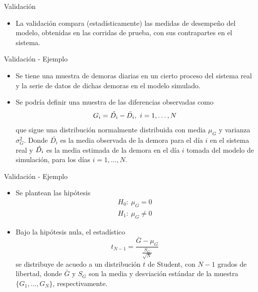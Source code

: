 \begin{frame}{Validación}
    \begin{itemize}
        \item La validación compara (estadísticamente) las medidas de desempeño del modelo, obtenidas en las corridas de prueba, con sus contrapartes en el sistema.
    \end{itemize}
\end{frame}

\begin{frame}{Validación - Ejemplo}
    \begin{itemize}
        \item Se tiene una muestra de demoras diarias en un cierto proceso del sistema real y la serie de datos de dichas demoras en el modelo simulado.
        \item Se podría definir una muestra de las diferencias observadas como \begin{equation*}
            G_i=\Hat{D_i}-\bar{D_i},~i=1,\dots, N
        \end{equation*}
        que sigue una distribución normalmente distribuida con media $\mu_G$ y varianza $\sigma^2_G$. Donde $\bar{D_i}$ es la media observada de la demora para el día $i$ en el sistema real y $\Hat{D_i}$ es la media estimada de la demora en el día $i$ tomada del modelo de simulación, para los días $i=1,\dots, N$.
    \end{itemize}
\end{frame}

\begin{frame}{Validación - Ejemplo}
    \begin{itemize}
        \item Se plantean las hipótesis 
        \begin{eqnarray*}
            H_0:~\mu_G=0\\
            H_1:~\mu_G \neq 0
        \end{eqnarray*}
        \item Bajo la hipótesis nula, el estadístico
        \begin{equation*}
            t_{N-1}=\frac{\bar{G}-\mu_G}{\frac{S_G}{\sqrt{N}}}
        \end{equation*}
        se distribuye de acuedo a un distribución $t$ de Student, con $N-1$ grados de libertad, donde $\bar{G}$ y $S_G$ son la media y desviación estándar de la muestra $\{G_1,\dots,G_N\}$, respectivamente.
    \end{itemize}
\end{frame}

